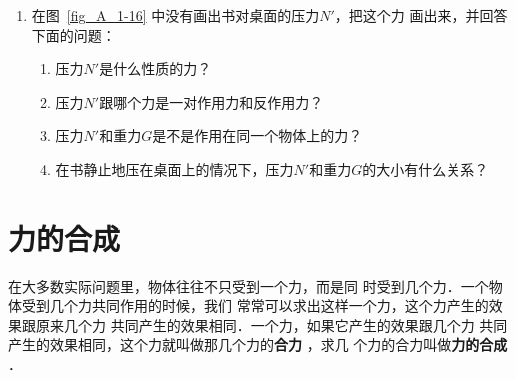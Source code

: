 \begin{enumerate}
\item  在图~\ref{fig_A_1-16} 中没有画出书对桌面的压力$N'$，把这个力
画出来，并回答下面的问题：
\begin{enumerate} 
\item 压力$N'$是什么性质的力？
\item 压力$N'$跟哪个力是一对作用力和反作用力？
\item 压力$N'$和重力$G$是不是作用在同一个物体上的力？
\item 在书静止地压在桌面上的情况下，压力$N'$和重力$G$的大小有什么关系？
\end{enumerate} 


\end{enumerate} 

\section{力的合成} 

    在大多数实际问题里，物体往往不只受到一个力，而是同
时受到几个力．一个物体受到几个力共同作用的时候，我们
常常可以求出这样一个力，这个力产生的效果跟原来几个力
共同产生的效果相同．一个力，如果它产生的效果跟几个力
共同产生的效果相同，这个力就叫做那几个力的\textbf{合力} ，求几
个力的合力叫做\textbf{力的合成} ． 

